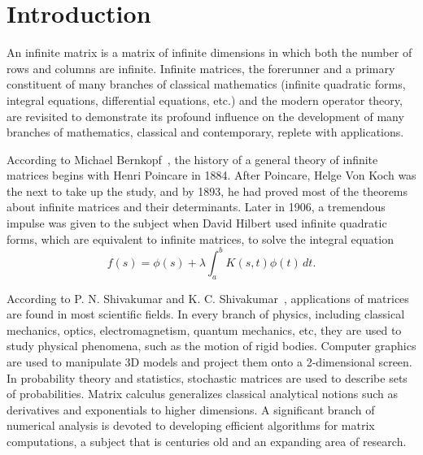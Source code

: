 \chapter{Introduction}

An infinite matrix is a matrix of infinite dimensions in which both the number of rows and columns are infinite. Infinite matrices, the forerunner and a primary constituent of many branches of classical mathematics (infinite quadratic forms, integral equations, differential equations, etc.) and the modern operator theory, are revisited to demonstrate its profound influence on the development of many branches of mathematics, classical and contemporary, replete with applications.
\newline

According to Michael Bernkopf~\cite{History-infinite-matrics}, the history of a general theory of infinite matrices begins with Henri Poincare in 1884. After Poincare, Helge Von Koch was the next to take up the study, and by 1893, he had proved most of the theorems about infinite matrices and their determinants. Later in 1906, a tremendous impulse was given to the subject when David Hilbert used infinite quadratic forms, which are equivalent to infinite matrices, to solve the integral equation \[f(s) = \phi(s) + \lambda \int_{a}^{b} K(s, t) \phi(t) \, dt.\]

According to P. N. Shivakumar and K. C. Shivakumar~\cite{shivakumar1972diagonally}, applications of matrices are found in most scientific fields. In every branch of physics, including classical mechanics, optics, electromagnetism, quantum mechanics, etc, they are used to study physical phenomena, such as the motion of rigid bodies. Computer graphics are used to manipulate 3D models and project them onto a 2-dimensional screen. In probability theory and statistics, stochastic matrices are used to describe sets of probabilities. Matrix calculus generalizes classical analytical notions such as derivatives and exponentials to higher dimensions. A significant branch of numerical analysis is devoted to developing efficient algorithms for matrix computations, a subject that is centuries old and an expanding area of research. 

